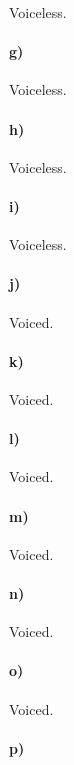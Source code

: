 \documentclass[12pt]{article}
\begin{document}
Voiceless.

\paragraph{g)}

Voiceless.

\paragraph{h)}

Voiceless.

\paragraph{i)}

Voiceless.

\paragraph{j)}

Voiced.

\paragraph{k)}

Voiced.

\paragraph{l)}

Voiced.

\paragraph{m)}

Voiced.

\paragraph{n)}

Voiced.

\paragraph{o)}

Voiced.

\paragraph{p)}
\end{document}
